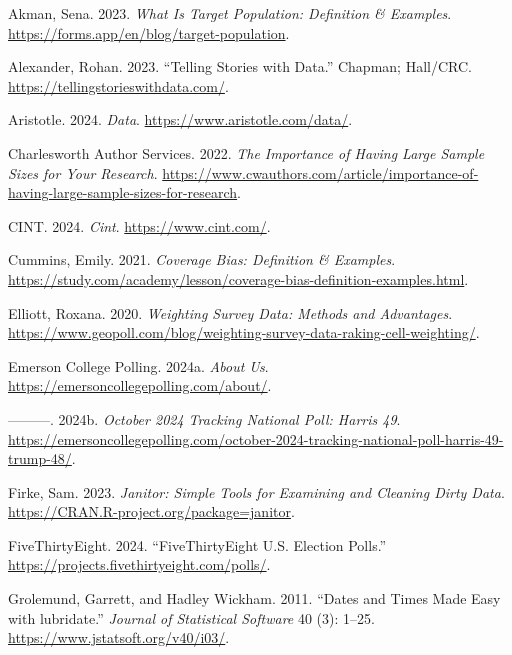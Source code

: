 \documentclass[
  letterpaper,
  DIV=11,
  numbers=noendperiod]{scrartcl}
\newlength{\cslhangindent}
\newlength{\cslentryspacingunit} %
\newenvironment{CSLReferences}[2] %
 {%
  \setlength{\parindent}{0pt}
  \ifodd #1
  \let\oldpar\par
  \def\par{\hangindent=\cslhangindent\oldpar}
  \fi
  \setlength{\parskip}{#2\cslentryspacingunit}
 }%
 {}
\begin{document}
\hypertarget{refs}{}
\begin{CSLReferences}{1}{0}
\leavevmode{}%
Akman, Sena. 2023. \emph{What Is Target Population: Definition \&
Examples}. \url{https://forms.app/en/blog/target-population}.

\leavevmode{}%
Alexander, Rohan. 2023. {``Telling Stories with Data.''} Chapman;
Hall/CRC. \url{https://tellingstorieswithdata.com/}.

\leavevmode{}%
Aristotle. 2024. \emph{Data}. \url{https://www.aristotle.com/data/}.

\leavevmode{}%
Charlesworth Author Services. 2022. \emph{The Importance of Having Large
Sample Sizes for Your Research}.
\url{https://www.cwauthors.com/article/importance-of-having-large-sample-sizes-for-research}.

\leavevmode{}%
CINT. 2024. \emph{Cint}. \url{https://www.cint.com/}.

\leavevmode{}%
Cummins, Emily. 2021. \emph{Coverage Bias: Definition \& Examples}.
\url{https://study.com/academy/lesson/coverage-bias-definition-examples.html}.

\leavevmode{}%
Elliott, Roxana. 2020. \emph{Weighting Survey Data: Methods and
Advantages}.
\url{https://www.geopoll.com/blog/weighting-survey-data-raking-cell-weighting/}.

\leavevmode{}%
Emerson College Polling. 2024a. \emph{About Us}.
\url{https://emersoncollegepolling.com/about/}.

\leavevmode{}%
---------. 2024b. \emph{October 2024 Tracking National Poll: Harris 49}.
\url{https://emersoncollegepolling.com/october-2024-tracking-national-poll-harris-49-trump-48/}.

\leavevmode{}%
Firke, Sam. 2023. \emph{Janitor: Simple Tools for Examining and Cleaning
Dirty Data}. \url{https://CRAN.R-project.org/package=janitor}.

\leavevmode{}%
FiveThirtyEight. 2024. {``{FiveThirtyEight U.S. Election Polls}.''}
\url{https://projects.fivethirtyeight.com/polls/}.

\leavevmode{}%
Grolemund, Garrett, and Hadley Wickham. 2011. {``Dates and Times Made
Easy with {lubridate}.''} \emph{Journal of Statistical Software} 40 (3):
1--25. \url{https://www.jstatsoft.org/v40/i03/}.


\end{CSLReferences}
\end{document}

